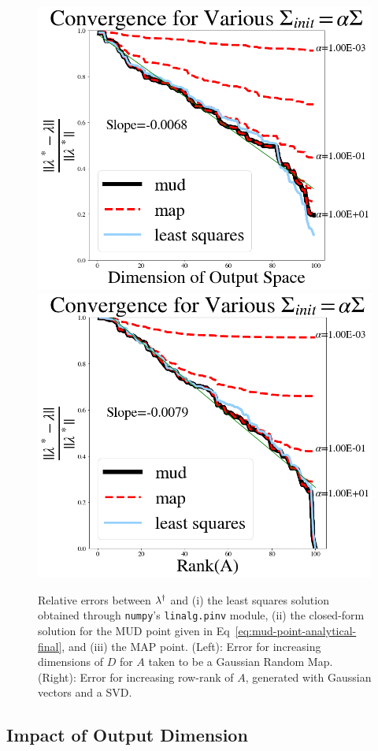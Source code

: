 \begin{figure}[htbp]
  \includegraphics[width=0.475\linewidth]{figures/lin/lin-dim-cov-convergence}
  \includegraphics[width=0.475\linewidth]{figures/lin/lin-rank-cov-convergence}
\caption{
	Relative errors between $\lambda^\dagger$ and (i) the least squares solution obtained through {\tt numpy}'s {\tt linalg.pinv} module, (ii) the closed-form solution for the MUD point given in Eq~\eqref{eq:mud-point-analytical-final}, and (iii) the MAP point.
  (Left): Error for increasing dimensions of $D$ for $A$ taken to be a Gaussian Random Map.
  (Right): Error for increasing row-rank of $A$, generated with Gaussian vectors and a SVD.
}
\label{fig:lin-error}
\end{figure}


\subsection{Impact of Output Dimension}%



